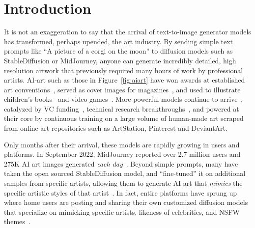 \secspace
\section{Introduction}
\label{sec:intro}

It is not an exaggeration to say that the arrival of text-to-image generator
models has transformed, perhaps upended, the art industry. By sending simple
text prompts like ``A picture of a corgi on the moon'' to diffusion models
such as StableDiffusion or MidJourney, anyone can generate incredibly
detailed, high resolution artwork that previously required many hours of work
by professional artists. AI-art such as those in Figure~\ref{fig:aiart} have
won awards at established art conventions~\cite{winaward}, served as
cover images for magazines~\cite{c-ai-cover}, and used to
illustrate children's books~\cite{children-book} and video
games~\cite{aigame}. More powerful models continue to
arrive~\cite{stable2-1,mid-4,novelai-update}, catalyzed by VC
funding~\cite{sd-funding,scenario-vc,other1-funding}, technical research
breakthroughs~\cite{kawar2022imagic,chen2022re,meng2022distillation,li2022scaling,balaji2022ediffi},
and powered at their core by continuous training on a large volume of human-made
art scraped from online art repositories such as ArtStation, Pinterest and DeviantArt. 

Only months after their arrival, these models are rapidly growing in users
and platforms. In September 2022, MidJourney reported over 2.7 million
users and 275K AI art images generated {\em each
  day}~\cite{midjourneystat}. Beyond simple prompts, many have taken the open
sourced StableDiffusion model, and ``fine-tuned'' it on additional samples
from specific artists, allowing them to generate AI art that {\em mimics} the
specific artistic styles of that artist~\cite{aiart-greg}. In fact, entire
platforms have sprung up where home users are posting and sharing their own
customized diffusion models that specialize on mimicking specific artists, likeness of
celebrities, and NSFW themes~\cite{civitai}. 


